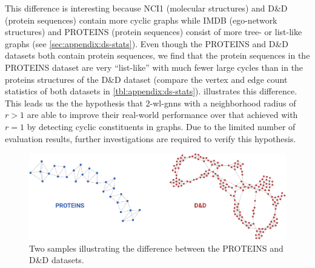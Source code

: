 This difference is interesting because NCI1 (molecular structures) and D\&D (protein sequences) contain more cyclic graphs while IMDB (ego-network structures) and PROTEINS (protein sequences) consist of more tree- or list-like graphs (see \cref{sec:appendix:ds-stats}).
Even though the PROTEINS and D\&D datasets both contain protein sequences, we find that the protein sequences in the PROTEINS dataset are very ``list-like'' with much fewer large cycles than in the proteins structures of the D\&D dataset (compare the vertex and edge count statistics of both datasets in \cref{tbl:appendix:ds-stats}).
 illustrates this difference.
This leads us the the hypothesis that 2-\acs{wl}-\acsp{gnn} with a neighborhood radius of $r > 1$ are able to improve their real-world performance over that achieved with $r = 1$ by detecting cyclic constituents in graphs.
Due to the limited number of evaluation results, further investigations are required to verify this hypothesis.
\begin{figure}[h]
	\centering
	\includegraphics[width=0.8\linewidth]{gfx/evaluation/proteins-dd-diff.pdf}
	\caption{
		Two samples illustrating the difference between the PROTEINS and D\&D datasets.
	}\label{fig:evaluation:proteins-dd-diff}
\end{figure}

